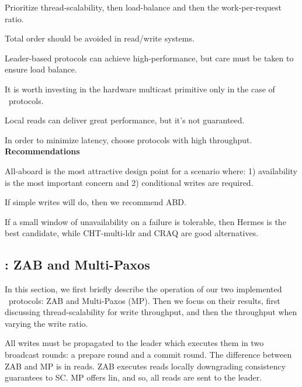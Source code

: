 \squishlist
\item %
Prioritize thread-scalability, then load-balance and then the work-per-request ratio.
\item Total order should be avoided in read/write systems.
\item Leader-based protocols can achieve high-performance, but care must be taken to ensure load balance. 
\item It is worth investing in the hardware multicast primitive only in the case of \LPKO\ protocols. 
\item Local reads can deliver great performance, but it's not guaranteed.
\item In order to minimize latency, choose protocols with high throughput.
\squishend
\noindent\textbf{Recommendations}
\squishlistContrib
\item All-aboard is the most attractive design point for a scenario where: 1) availability is the most important concern and 2) conditional writes are required.
\item If simple writes will do, then we recommend ABD.
\item If a small window of unavailability on a failure is tolerable, then Hermes is the best candidate, while CHT-multi-ldr and CRAQ are good alternatives.
\squishend 







\subsection{\LTO: ZAB and Multi-Paxos}\label{sec:ev:lto}


In this section, we first briefly describe the operation of our two implemented \LTO~protocols: ZAB and Multi-Paxos (MP). 
Then we focus on their results, first discussing thread-scalability for write throughput, and then the throughput when varying the write ratio.



All writes must be propagated to the leader which executes them in two broadcast rounds: a prepare round and a commit round.
The difference between ZAB and MP is in reads. ZAB executes reads locally downgrading consistency guarantees to SC.
MP offers lin, and so, all reads are sent to the leader.





